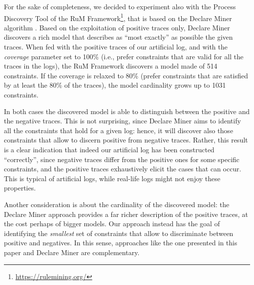 For the sake of completeness, we decided to experiment also with the Process Discovery Tool of the RuM Framework\footnote{\url{https://rulemining.org/}}, that is based on the Declare Miner algorithm \cite{2018a-Maggi}. Based on the exploitation of positive traces only, Declare Miner discovers a rich model that describes as ``most exactly'' as possible the given traces. When fed with the positive traces of our artificial log, and with the \emph{coverage} parameter set to 100\% (i.e., prefer constraints that are valid for all the traces in the logs), the RuM Framework discovers a model made of 514 constraints. If the coverage is relaxed to 80\% (prefer constraints that are satisfied by at least the 80\% of the traces), the model cardinality grows up to 1031 constraints.

In both cases the discovered model is able to distinguish between the positive and the negative traces. This is not surprising, since Declare Miner aims to identify all the constraints that hold for a given log: hence, it will discover also those constraints that allow to discern positive from negative traces. Rather, this result is a clear indication that indeed our artificial log has been constructed ``correctly'', since negative traces differ from the positive ones for some specific constraints, and the positive traces exhaustively elicit the cases that can occur. 
This is typical of artificial logs, while real-life logs might not enjoy these properties.

Another consideration is about the cardinality of the discovered model: the Declare Miner approach provides a far richer description of the positive traces, at the cost perhaps of bigger models. Our approach instead has the goal of identifying the \emph{smallest} set of constraints that allow to discriminate between positive and negatives. In this sense, approaches like the one presented in this paper and Declare Miner are complementary.




